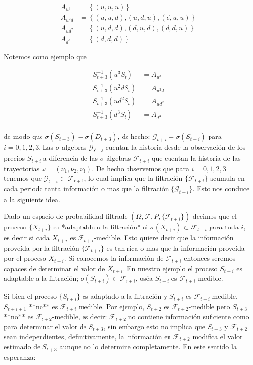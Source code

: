 \documentclass{extreport}
\theoremstyle{definicion}
\theoremstyle{propiedad}
\begin{document}
\begin{align*}
A_{u^3} & = \left\{(u,u,u)\right\}\\
A_{u^2d} & = \left\{(u,u,d),(u,d,u),(d,u,u)\right\}\\ 
A_{ud^2} & = \left\{(u,d,d),(d,u,d), (d,d,u)\right\} \\
A_{d^3} & = \left\{(d,d,d)\right\}
\end{align*}


Notemos como ejemplo que 


\begin{align*}
S_{t+3}^{-1}(u^3S_t) & = A_{u^3}\\
S_{t+3}^{-1}(u^2dS_t) & = A_{u^2d}\\
S_{t+3}^{-1}(ud^2S_t) & = A_{ud^2}\\
S_{t+3}^{-1}(d^3S_t) & = A_{d^3}\\ 
\end{align*}


de modo que  $\sigma(S_{t+3}) = \sigma(D_{t+3})$, de hecho: $\mathcal{G}_{t+i} = \sigma(S_{t+i})$ para $i = 0,1,2,3$. Las $\sigma$-algebras $\mathcal{G_{t+i}}$ cuentan la historia desde la observación de los precios $S_{t+i}$ a diferencia  de las $\sigma$-álgebras $\mathcal{F}_{t+i}$ que cuentan la historia de las trayectorias $\omega = (\nu_1, \nu_2, \nu_3)$. De hecho observemos que para $i= 0, 1, 2,3$ tenemos que $\mathcal{G}_{t+i}\subset\mathcal{F}_{t+1}$, lo cual implica que la filtración $\{\mathcal{F}_{t+i}\}$ acumula en cada periodo tanta información o mas que la filtración $\{\mathcal{G}_{t+i}\}$. Esto nos conduce a la siguiente idea.

Dado un espacio de probabilidad filtrado $(\Omega, \mathcal{F}, P, \{\mathcal{F}_{t+i}\})$ decimos que el proceso $\{X_{t+i}\}$ es *adaptable a la filtración* si $\sigma(X_{t+i})\subset \mathcal{F}_{t+i}$ para toda $i$,  es decir si cada $X_{t+i}$ es $\mathcal{F}_{t+i}$-medible. Esto quiere decir que  la información proveída por la filtración $\{\mathcal{F}_{t+i}\}$ es tan rica o mas que la información proveída por el proceso $X_{t+i}$. Si  conocemos la información de $\mathcal{F}_{t+i}$ entonces seremos capaces de determinar el valor de $X_{t+i}$. En nuestro ejemplo el proceso ${S_{t+i}}$ es adaptable a la filtración; $\sigma(S_{t+i})\subset \mathcal{F}_{t+i}$, oséa $S_{t+i}$ es $\mathcal{F}_{t+i}$-medible.

Si bien el proceso $\{S_{t+i}\}$ es adaptado a la filtración y $S_{t+i}$  es $\mathcal{F}_{t+i}$-medible, $S_{t+i+1}$ **no** es $\mathcal{F}_{t+i}$ medible. Por ejemplo, $S_{t+2}$ es $\mathcal{F}_{t+2}$-medible pero $S_{t+3}$ **no** es $\mathcal{F}_{t+2}$-medible, es decir; $\mathcal{F}_{t+2}$ no contiene información suficiente como para determinar el valor de $S_{t+3}$, sin embargo esto no implica que $S_{t+3}$ y $\mathcal{F}_{t+2}$ sean independientes, definitivamente, la información en $\mathcal{F}_{t+2}$ modifica el valor estimado de $S_{t+3}$ aunque no lo determine completamente. En este sentido la esperanza:
\end{document}
